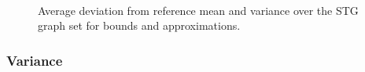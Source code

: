 \documentclass[12pt]{article}
\begin{document}
      \begin{figure}
	\centering	
	\\
	\caption{Average deviation from reference mean and variance over the STG graph set for bounds and approximations.}	
	\label{plot.stg_mean_var} 
      \end{figure}

      \subsubsection{Variance}
\label{subsubsect.existing_variance}
\end{document}
